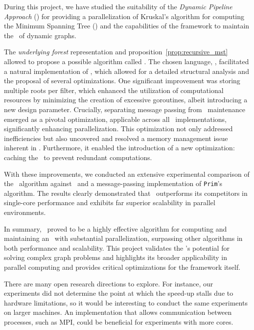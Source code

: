 During this project, we have studied the suitability of the \emph{Dynamic Pipeline Approach} (\dpm) for providing a parallelization of Kruskal's algorithm for computing the Minimum Spanning Tree (\mst) and the capabilities of the framework to maintain the \mst\ of dynamic graphs.

The \emph{underlying forest} representation and proposition~\ref{prop:recursive_mst} allowed to propose a possible algorithm called \DPmst. The chosen language, \Go, facilitated a natural implementation of \DPmst, which allowed for a detailed structural analysis and the proposal of several optimizations. One significant improvement was storing multiple roots per filter, which enhanced the utilization of computational resources by minimizing the creation of excessive goroutines, albeit introducing a new design parameter. Crucially, separating message passing from \mst\ maintenance emerged as a pivotal optimization, applicable across all \dpm\ implementations, significantly enhancing parallelization. This optimization not only addressed inefficiencies but also uncovered and resolved a memory management issue inherent in \Go. Furthermore, it enabled the introduction of a new optimization: caching the \mst\ to prevent redundant computations.

With these improvements, we conducted an extensive experimental comparison of the \DPmst\ algorithm against \FKruskal\ and a message-passing implementation of {\tt Prim}'s algorithm. The results clearly demonstrated that \DPmst\ outperforms its competitors in single-core performance and exhibits far superior scalability in parallel environments.

In summary, \DPmst\ proved to be a highly effective algorithm for computing and maintaining an \mst\ with substantial parallelization, surpassing other algorithms in both performance and scalability. This project validates the \dpm's potential for solving complex graph problems and highlights its broader applicability in parallel computing and provides critical optimizations for the framework itself.

There are many open research directions to explore. For instance, our experiments did not determine the point at which the speed-up stalls due to hardware limitations, so it would be interesting to conduct the same experiments on larger machines. An implementation that allows communication between processes, such as MPI, could be beneficial for experiments with more cores.

